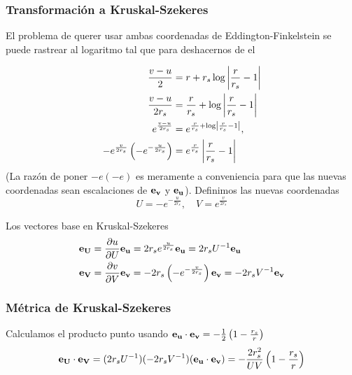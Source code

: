 \subsubsection{Transformación a Kruskal-Szekeres}
El problema de querer usar ambas coordenadas de Eddington-Finkelstein se puede rastrear al logaritmo tal que para deshacernos de el

\begin{equation}
    \begin{aligned}
        \frac{v-u}{2}                                          & =r+r_s \log \left|\frac{r}{r_s}-1\right|           \\
        \frac{v-u}{2 r_s}                                      & =\frac{r}{r_s}+\log \left|\frac{r}{r_s}-1\right|   \\
        e^{\frac{v-u}{2 r_s}}                                  & =e^{\frac{r}{r_s}+\log \left|  \frac{r}{r_s} - 1 \right| }, \\
        -e^{\frac{v}{2 r_s}}\left(-e^{-\frac{u}{2 r_s}}\right) & =e^{\frac{r}{r_s}}\left|\frac{r}{r_s}-1\right|
    \end{aligned}
\end{equation}
(La razón de poner $-e(-e)$ es meramente a conveniencia para que las nuevas coordenadas sean escalaciones de $\mathbf{e_v}$ y $\mathbf{e_u}$).
Definimos las nuevas coordenadas
\begin{equation}
    U = -e^{-\frac{u}{2r_s}}, \quad V = e^{\frac{v}{2 r_s}}
\end{equation}

Los vectores base en Kruskal-Szekeres
\begin{equation}
    \begin{aligned}
        \mathbf{e_U} & = \frac{\partial u}{\partial U} \mathbf{e_u} = 2r_s e^{\frac{u}{2r_s}} \mathbf{e_u}  = 2r_s U^{-1} \mathbf{e_u}                    \\
        \mathbf{e_V} & = \frac{\partial v}{\partial V} \mathbf{e_v} = -  2r_s \left(- e^{-\frac{v}{2r_s}}\right) \mathbf{e_v} =- 2r_s V^{-1} \mathbf{e_v}
    \end{aligned}
\end{equation}

\subsubsection{Métrica de Kruskal-Szekeres}
Calculamos el producto punto usando \( \mathbf{e_u} \cdot \mathbf{e_v} = -\frac{1}{2}\left(1-\frac{r_s}{r}\right) \)
\begin{equation}
    \mathbf{e_U} \cdot \mathbf{e_V} = (2r_s U^{-1})(-2r_s V^{-1})(\mathbf{e_u} \cdot \mathbf{e_v}) = - \frac{2r_s^2}{U V}\left(1-\frac{r_s}{r}\right)
\end{equation}

